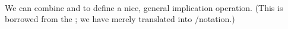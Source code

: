 \documentclass[a4paper,UKenglish,cleveref,autoref,thm-restate,11pt]{lipics-v2021}
\begin{document}
\begin{code}
\AgdaSymbol{:}\AgdaSpace{}%
\AgdaSymbol{\}\{}\AgdaSpace{}%
\AgdaSymbol{:}\AgdaSpace{}%
\AgdaSpace{}%
\AgdaSpace{}%
\AgdaSymbol{\}}\AgdaSpace{}%
\AgdaSymbol{\{}\AgdaSpace{}%
\AgdaSymbol{:}\AgdaSpace{}%
\AgdaSpace{}%
\AgdaSpace{}%
\AgdaSymbol{\}}\<%
\\
\>[0][@{}l@{\AgdaIndent{0}}]%
\>[1]%
\>[6]\AgdaSpace{}%
\AgdaSpace{}%
\AgdaSpace{}%
\AgdaSpace{}%
\AgdaSpace{}%
\AgdaSpace{}%
\AgdaSpace{}%
\AgdaSpace{}%
\AgdaSpace{}%
\AgdaSpace{}%
\AgdaSpace{}%
\AgdaSpace{}%
\AgdaSpace{}%
\AgdaSpace{}%
\AgdaSpace{}%
\AgdaSpace{}%
\AgdaSpace{}%
\<%
\\
%
\\[\AgdaEmptyExtraSkip]%
\>[0]\AgdaSpace{}%
\AgdaSpace{}%
\AgdaSpace{}%
\AgdaSymbol{=}\AgdaSpace{}%
\AgdaSpace{}%
\AgdaSymbol{\{}\AgdaSpace{}%
\AgdaSymbol{\}}\AgdaSpace{}%
\AgdaSpace{}%
\AgdaSpace{}%
\AgdaSpace{}%
\AgdaSpace{}%
\AgdaSpace{}%
\AgdaSpace{}%
\AgdaSpace{}%
\<%
\end{code}
\ccpad
We can combine  and  to define a nice, general implication operation. (This is borrowed from the \agdastdlib; we have merely translated into \typetopology/\ualib notation.)
\ccpad
\end{document}
